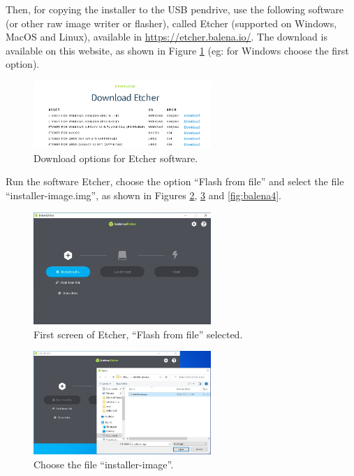 \documentclass[11pt,a4paper]{article}
\begin{document}
Then, for copying the installer to the USB pendrive, use the following software (or other raw image writer or flasher), called
Etcher (supported on Windows, MacOS and Linux), available in \url{https://etcher.balena.io/}. The download is available on this website,
as shown in Figure \ref{fig:balena1} (eg: for Windows choose the first option).

\begin{figure}[H]
  \centering
  \includegraphics[width=0.6\textwidth]{pictures/balena-1.png}
  \caption{Download options for Etcher software.}
  \label{fig:balena1}
\end{figure}

Run the software Etcher, choose the option ``Flash from file'' and select the file ``installer-image.img'', as shown in Figures \ref{fig:balena2}, \ref{fig:balena3} and \ref{fig:balena4}.

\begin{figure}[H]
  \centering
  \includegraphics[width=0.6\textwidth]{pictures/balena-2-ed.jpg}
  \caption{First screen of Etcher, ``Flash from file'' selected.}
  \label{fig:balena2}
\end{figure}

\begin{figure}[H]
  \centering
  \includegraphics[width=0.6\textwidth]{pictures/balena-3-ed.jpg}
  \caption{Choose the file ``installer-image''.}
  \label{fig:balena3}
\end{figure}
\end{document}
